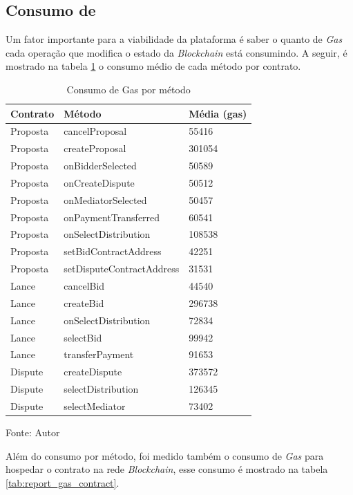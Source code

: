 \subsection{Consumo de }

Um fator importante para a viabilidade da plataforma é saber o quanto de \textit{Gas} cada operação que modifica o estado da \textit{Blockchain} está consumindo. A seguir, é mostrado na tabela \ref{tab:report_gas} o consumo médio de cada método por contrato.

\begin{table}[!h]
\centering
\caption{Consumo de Gas por método}
\label{tab:report_gas}
\begin{tabular}{@{}lll@{}}
\toprule
Contrato & Método    & Média (gas) \\ \midrule
Proposta & cancelProposal & 55416 \\
Proposta & createProposal & 301054 \\
Proposta & onBidderSelected & 50589 \\
Proposta & onCreateDispute & 50512 \\
Proposta & onMediatorSelected & 50457 \\
Proposta & onPaymentTransferred & 60541 \\
Proposta & onSelectDistribution & 108538 \\
Proposta & setBidContractAddress & 42251 \\
Proposta & setDisputeContractAddress & 31531 \\
Lance & cancelBid & 44540 \\
Lance & createBid & 296738 \\
Lance & onSelectDistribution & 72834 \\
Lance & selectBid & 99942 \\
Lance & transferPayment & 91653 \\
Dispute & createDispute & 373572 \\
Dispute & selectDistribution & 126345 \\
Dispute & selectMediator & 73402 \\ \bottomrule
\end{tabular}
\begin{tablenotes}
  \small
  \item Fonte: Autor
\end{tablenotes}
\end{table}

Além do consumo por método, foi medido também o consumo de \textit{Gas} para hospedar o contrato na rede \textit{Blockchain}, esse consumo é mostrado na tabela \ref{tab:report_gas_contract}.

